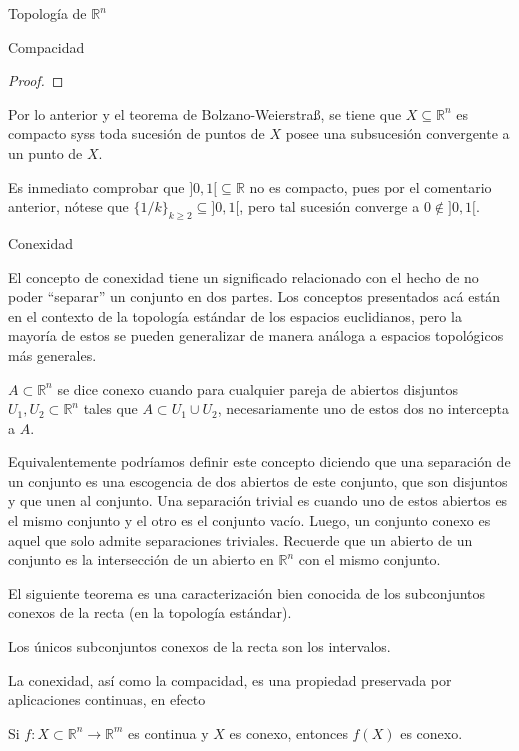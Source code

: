 \begin{chapter}{Topología de $\mathbb{R}^n$}
\begin{section}{Compacidad}
\begin{proof}

\end{proof}

Por lo anterior y el teorema de Bolzano-Weierstra{\ss}, se tiene que $X\subseteq\mathbb{R}^n$ es compacto syss toda sucesión de puntos de $X$ posee una subsucesión convergente a un punto de $X$.

Es inmediato comprobar que $]0,1[\subseteq\mathbb{R}$ no es compacto, pues por el comentario anterior, nótese que $\{1/k\}_{k\geq2}\subseteq]0,1[$, pero tal sucesión converge a $0\notin]0,1[$.

\end{section}

\begin{section}{Conexidad}

El concepto de conexidad tiene un significado relacionado con el hecho de no poder ``separar'' un conjunto en dos partes. Los conceptos presentados acá están en el contexto de la topología estándar de los espacios euclidianos, pero la mayoría de estos se pueden generalizar de manera análoga a espacios topológicos más generales.

\begin{defn}
$A \subset \mathbb{R}^n$ se dice conexo cuando para cualquier pareja de abiertos disjuntos $U_1, U_2 \subset \mathbb{R}^n$ tales que $A \subset U_1 \cup U_2$, necesariamente uno de estos dos no intercepta a $A$.
\end{defn}
Equivalentemente podríamos definir este concepto diciendo que una separación de un conjunto es una escogencia de dos abiertos de este conjunto, que son disjuntos y que unen al conjunto. Una separación trivial es cuando uno de estos abiertos es el mismo conjunto y el otro es el conjunto vacío. Luego, un conjunto conexo es aquel que solo admite separaciones triviales. Recuerde que un abierto de un conjunto es la intersección de un abierto en $\mathbb{R}^n$ con el mismo conjunto.

El siguiente teorema es una caracterización bien conocida de los subconjuntos conexos de la recta (en la topología estándar).

\begin{them}
Los únicos subconjuntos conexos de la recta son los intervalos.
\end{them}

La conexidad, así como la compacidad, es una propiedad preservada por aplicaciones continuas, en efecto

\begin{them}
Si $f: X \subset \mathbb{R}^n \to \mathbb{R}^m$ es continua y $X$ es conexo, entonces $f(X)$ es conexo.
\end{them}


\end{section}
\end{chapter}

